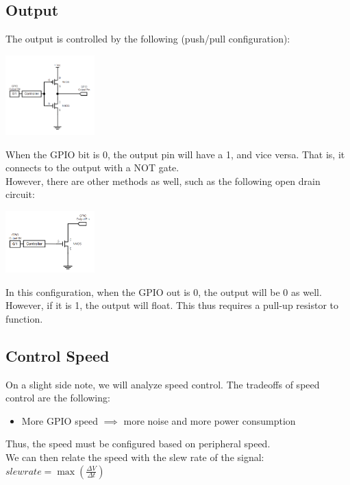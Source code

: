 \documentclass[nobib]{tufte-handout}
\begin{document}
\subsection{Output}
The output is controlled by the following (push/pull configuration):
\begin{center}
    \includegraphics[width = 130px]{images/output control.png}
\end{center}
When the GPIO bit is 0, the output pin will have a 1, and vice versa. That is, it connects to the output with a NOT gate.\\
However, there are other methods as well, such as the following open drain circuit:
\begin{center}
    \includegraphics[width = 130px]{images/open_drain_output_control.png}
\end{center}
In this configuration, when the GPIO out is 0, the output will be 0 as well. However, if it is 1, the output will float. This thus requires a pull-up resistor to function.\\
\subsection{Control Speed}
On a slight side note, we will analyze speed control.
The tradeoffs of speed control are the following:
\begin{itemize}
    \item More GPIO speed $\implies$ more noise and more power consumption
\end{itemize}
Thus, the speed must be configured based on peripheral speed.\\
We can then relate the speed with the slew rate of the signal:\\ $slewrate = \max\left(\frac{\Delta V}{\Delta t}\right)$\\
\end{document}

